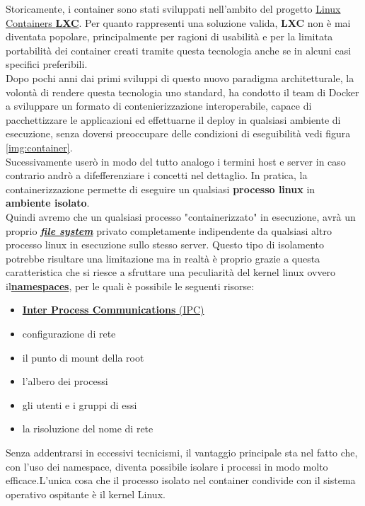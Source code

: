 \documentclass[a4paper,12pt,openright,twoside]{report}
\begin{document}
Storicamente, i container sono stati sviluppati nell’ambito del progetto \href{https://linuxcontainers.org/it/lxc/introduction/}{Linux Containers \textbf{LXC}}. Per quanto rappresenti una soluzione valida, \textbf{LXC} non è mai diventata popolare, principalmente per ragioni di usabilità e per la limitata portabilità dei container creati tramite questa tecnologia anche se in alcuni casi specifici preferibili.\\
Dopo pochi anni dai primi sviluppi di questo nuovo paradigma architetturale, la volontà di rendere questa tecnologia uno standard, ha condotto il team di Docker a sviluppare un formato di contenierizzazione interoperabile, capace di pacchettizzare le applicazioni ed effettuarne il deploy in qualsiasi ambiente di esecuzione, senza doversi preoccupare delle condizioni di eseguibilità vedi figura \ref{img:container}.\\
Sucessivamente userò in modo del tutto analogo i termini host e server in caso contrario andrò a difefferenziare i concetti nel dettaglio.
In pratica, la containerizzazione permette di eseguire un qualsiasi \textbf{processo linux} in \textbf{ambiente isolato}.\\
Quindi avremo che un qualsiasi processo "containerizzato" in esecuzione, avrà un proprio \href{https://it.wikipedia.org/wiki/File_system}{\textbf{\emph{ file system}}} privato completamente indipendente da qualsiasi altro processo linux in esecuzione sullo stesso server.
Questo tipo di isolamento potrebbe risultare una limitazione ma in realtà è proprio grazie a questa caratteristica che si riesce a sfruttare una peculiarità del kernel linux ovvero il\href{https://en.wikipedia.org/wiki/Linux_namespaces}{\textbf{namespaces}}, per le quali è possibile  le seguenti risorse:\\
\begin{itemize}
\item\href{https://it.wikipedia.org/wiki/Comunicazione_tra_processi}{\textbf{Inter Process Communications} (IPC)}
\item configurazione di rete
\item il punto di mount della root
\item l’albero dei processi
\item gli utenti e i gruppi di essi
\item la risoluzione del nome di rete
\end{itemize}
Senza addentrarsi in eccessivi tecnicismi, il vantaggio principale sta nel fatto che, con l’uso dei namespace, diventa possibile isolare i processi in modo molto efficace.L’unica cosa che il processo isolato nel container condivide con il sistema operativo ospitante è il kernel Linux.\\\\\\\\\\\\
\end{document}
